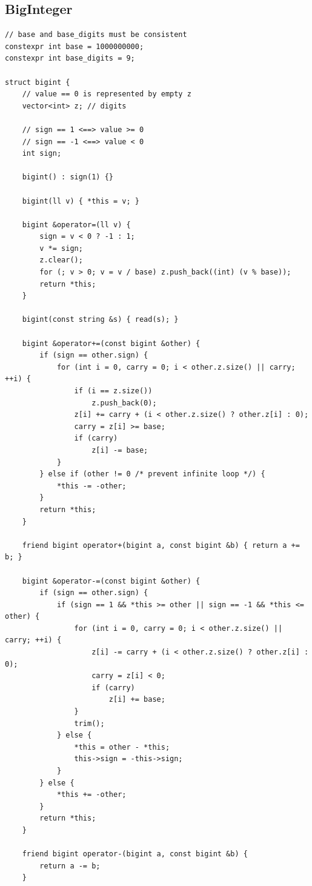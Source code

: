 \documentclass[twoside]{article}
\begin{document}
\subsection{BigInteger}
\begin{lstlisting}
// base and base_digits must be consistent
constexpr int base = 1000000000;
constexpr int base_digits = 9;

struct bigint {
    // value == 0 is represented by empty z
    vector<int> z; // digits

    // sign == 1 <==> value >= 0
    // sign == -1 <==> value < 0
    int sign;

    bigint() : sign(1) {}

    bigint(ll v) { *this = v; }

    bigint &operator=(ll v) {
        sign = v < 0 ? -1 : 1;
        v *= sign;
        z.clear();
        for (; v > 0; v = v / base) z.push_back((int) (v % base));
        return *this;
    }

    bigint(const string &s) { read(s); }

    bigint &operator+=(const bigint &other) {
        if (sign == other.sign) {
            for (int i = 0, carry = 0; i < other.z.size() || carry; ++i) {
                if (i == z.size())
                    z.push_back(0);
                z[i] += carry + (i < other.z.size() ? other.z[i] : 0);
                carry = z[i] >= base;
                if (carry)
                    z[i] -= base;
            }
        } else if (other != 0 /* prevent infinite loop */) {
            *this -= -other;
        }
        return *this;
    }

    friend bigint operator+(bigint a, const bigint &b) { return a += b; }

    bigint &operator-=(const bigint &other) {
        if (sign == other.sign) {
            if (sign == 1 && *this >= other || sign == -1 && *this <= other) {
                for (int i = 0, carry = 0; i < other.z.size() || carry; ++i) {
                    z[i] -= carry + (i < other.z.size() ? other.z[i] : 0);
                    carry = z[i] < 0;
                    if (carry)
                        z[i] += base;
                }
                trim();
            } else {
                *this = other - *this;
                this->sign = -this->sign;
            }
        } else {
            *this += -other;
        }
        return *this;
    }

    friend bigint operator-(bigint a, const bigint &b) {
        return a -= b;
    }


\end{lstlisting}
\end{document}

